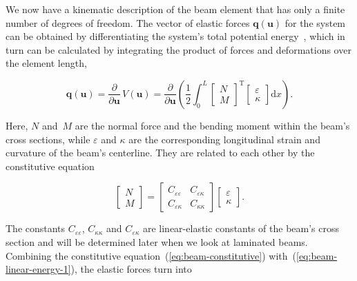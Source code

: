 We now have a kinematic description of the beam element that has only a finite number of degrees of freedom. The vector of elastic forces $\boldsymbol{q}(\boldsymbol{u})$ for the system can be obtained by differentiating the system's total potential energy~\cite{bib:wiki-lagrange}, which in turn can be calculated by integrating the product of forces and deformations over the element length,

\begin{equation}
\boldsymbol{q}(\boldsymbol{u}) = \frac{\partial}{\partial \boldsymbol{u}}\,V(\boldsymbol{u}) = \frac{\partial}{\partial \boldsymbol{u}}\left(\frac{1}{2}\int_0^L
\begin{bmatrix}
N\\
M
\end{bmatrix}^\mathrm{T}
\begin{bmatrix}
\varepsilon\\
\kappa
\end{bmatrix}
\mathrm{d}x\right).\label{eq:beam-linear-energy-1}
\end{equation}

Here, $N$ and~$M$ are the normal force and the bending moment within the beam's cross sections, while $\varepsilon$ and $\kappa$ are the corresponding longitudinal strain and curvature of the beam's centerline. They are related to each other by the constitutive equation

\begin{equation}
\begin{bmatrix}
N\\
M
\end{bmatrix}
=
\begin{bmatrix}
C_{\varepsilon\varepsilon} & C_{\varepsilon\kappa}\\
C_{\varepsilon\kappa} & C_{\kappa\kappa}
\end{bmatrix}
\begin{bmatrix}
\varepsilon\\
\kappa
\end{bmatrix}.\label{eq:beam-constitutive}
\end{equation}

The constants $C_{\varepsilon\varepsilon}$, $C_{\kappa\kappa}$ and $C_{\varepsilon\kappa}$ are linear-elastic constants of the beam's cross section and will be determined later when we look at laminated beams. Combining the constitutive equation~(\ref{eq:beam-constitutive}) with~(\ref{eq:beam-linear-energy-1}), the elastic forces turn into

